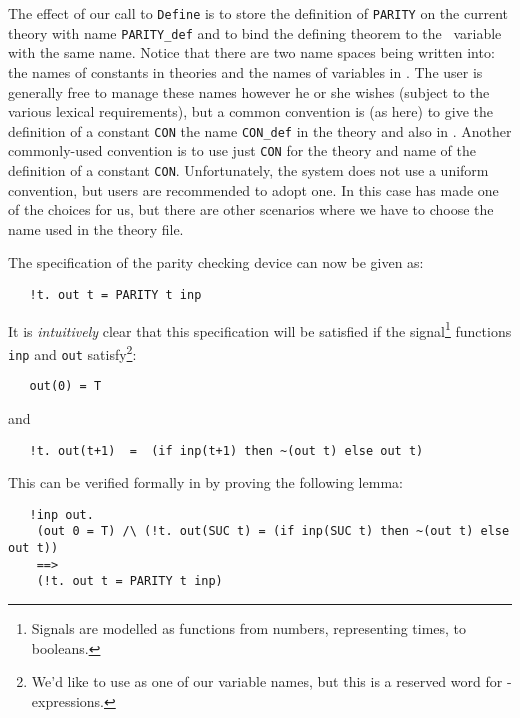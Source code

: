 The effect of our call to {\small\verb|Define|} is to store the
definition of {\small\verb|PARITY|} on the current theory with name
{\small\verb|PARITY_def|} and to bind the defining theorem to the \ML\
variable with the same name.  Notice that there are two name spaces
being written into: the names of constants in theories and the names
of variables in \ML.  The user is generally free to manage these names
however he or she wishes (subject to the various lexical
requirements), but a common convention is (as here) to give the
definition of a constant {\small\tt CON} the name
{\small\verb|CON_def|} in the theory and also in \ML.  Another
commonly-used convention is to use just {\small\verb|CON|} for the
theory and \ML{} name of the definition of a constant
{\small\verb|CON|}.  Unfortunately, the \HOL{} system does not use a
uniform convention, but users are recommended to adopt one.  In this
case \ml{Define} has made one of the choices for us, but there are
other scenarios where we have to choose the name used in the theory
file.

The specification of the parity checking device can now be given as:

{\small\begin{verbatim}
   !t. out t = PARITY t inp
\end{verbatim}}

\noindent
It is {\it intuitively\/} clear that this specification will be
satisfied if the signal\footnote{Signals are modelled as functions
  from numbers, representing times, to booleans.}  functions
{\small\verb|inp|} and {\small\verb|out|} satisfy\footnote{We'd like
  to use \ml{in} as one of our variable names, but this is a reserved
  word for \ml{let}-expressions.}:

{\small\begin{verbatim}
   out(0) = T
\end{verbatim}}

\noindent and

{\small\begin{verbatim}
   !t. out(t+1)  =  (if inp(t+1) then ~(out t) else out t)
\end{verbatim}}

\noindent This can be verified formally in \HOL{} by proving the
following lemma:

{\small\begin{verbatim}
   !inp out.
    (out 0 = T) /\ (!t. out(SUC t) = (if inp(SUC t) then ~(out t) else out t))
    ==>
    (!t. out t = PARITY t inp)
\end{verbatim}}

